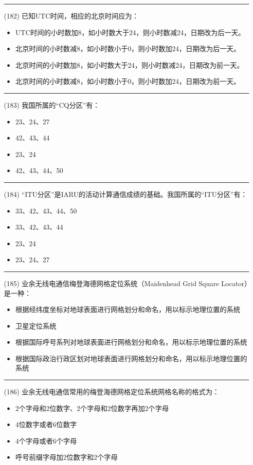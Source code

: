 \documentclass[twocolumn,hyperref,UTF8]{ctexart}  %
\begin{document}
\noindent\rule{0.5\textwidth}{1pt}
\heiti (182) 已知UTC时间，相应的北京时间应为： \songti {\color{gray} [LK0194] }
\begin{itemize}
	\item  UTC时间的小时数加8，如小时数大于24，则小时数减24，日期改为后一天。
	\item  北京时间的小时数减8，如小时数小于0，则小时数加24，日期改为后一天。
	\item  北京时间的小时数加8，如小时数大于24，则小时数减24，日期改为前一天。
	\item  北京时间的小时数减8，如小时数小于0，则小时数加24，日期改为前一天。
\end{itemize}


\noindent\rule{0.5\textwidth}{1pt}
\heiti (183) 我国所属的“CQ分区”有： \songti {\color{gray} [LK0202] }
\begin{itemize}
	\item  23、24、27
	\item  42、43、44
	\item  23、24
	\item  42、43、44、50
\end{itemize}


\noindent\rule{0.5\textwidth}{1pt}
\heiti (184) “ITU分区”是IARU的活动计算通信成绩的基础。我国所属的“ITU分区”有： \songti {\color{gray} [LK0204] }
\begin{itemize}
	\item  33、42、43、44、50
	\item  33、42、43、44
	\item  23、24
	\item  23、24、27
\end{itemize}


\noindent\rule{0.5\textwidth}{1pt}
\heiti (185) 业余无线电通信梅登海德网格定位系统（Maidenhead Grid Square Locator）是一种： \songti {\color{gray} [LK0862] }
\begin{itemize}
	\item  根据经纬度坐标对地球表面进行网格划分和命名，用以标示地理位置的系统
	\item  卫星定位系统
	\item  根据国际呼号系列对地球表面进行网格划分和命名，用以标示地理位置的系统
	\item  根据国际政治行政区划对地球表面进行网格划分和命名，用以标示地理位置的系统
\end{itemize}


\noindent\rule{0.5\textwidth}{1pt}
\heiti (186) 业余无线电通信常用的梅登海德网格定位系统网格名称的格式为： \songti {\color{gray} [LK0863] }
\begin{itemize}
	\item  2个字母和2位数字、2个字母和2位数字再加2个字母
	\item  4位数字或者6位数字
	\item  4个字母或者6个字母
	\item  呼号前缀字母加2位数字和2个字母
\end{itemize}
\end{document}
